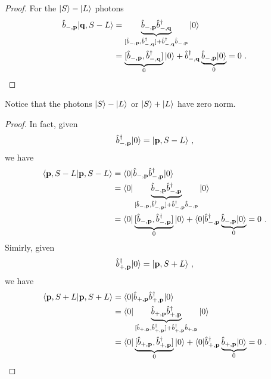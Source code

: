 \begin{proof}
        For the $\vert S\rangle - \vert L\rangle$ photons
        \begin{equation*}
        \begin{aligned}
            \hat b_{-, \mathbf p} \vert\mathbf q, S - L\rangle & = \underbrace{\hat b_{-, \mathbf p} \hat b_{-,\mathbf q}^{\dagger}}_{[\hat b_{-, \mathbf p}, \hat b_{-,\mathbf q}^{\dagger}] + \hat b_{-,\mathbf q}^{\dagger} \hat b_{-, \mathbf p} } \vert0\rangle \\ & = \underbrace{[\hat b_{-, \mathbf p}, \hat b_{-,\mathbf q}^{\dagger}]}_{0} \vert0\rangle + \hat b_{-,\mathbf q}^{\dagger} \underbrace{\hat b_{-, \mathbf p} \vert0\rangle}_0 = 0 ~.
        \end{aligned}
        \end{equation*}
    \end{proof}

    Notice that the photons $\vert S\rangle - \vert L\rangle$ or $\vert S\rangle + \vert L\rangle$ have zero norm. 
    \begin{proof}
        In fact, given
        \begin{equation*}
            \hat b_{-, \mathbf p}^\dagger \vert0\rangle = \vert\mathbf p, S - L\rangle ~,
        \end{equation*}
        we have 
        \begin{equation*}
        \begin{aligned}
            \langle\mathbf p, S-L\vert\mathbf p, S-L\rangle & = \langle0\vert \hat b_{-, \mathbf p} \hat b_{-, \mathbf p}^\dagger \vert0\rangle \\ & = \langle0\vert \underbrace{\hat b_{-, \mathbf p} \hat b_{-, \mathbf p}^\dagger}_{[\hat b_{-, \mathbf p} , \hat b_{-, \mathbf p}^\dagger] + \hat b_{-, \mathbf p}^\dagger \hat b_{-, \mathbf p}} \vert0\rangle \\ & = \langle0\vert \underbrace{[\hat b_{-, \mathbf p} , \hat b_{-, \mathbf p}^\dagger]}_0 \vert0\rangle + \langle0\vert \hat b_{-, \mathbf p}^\dagger \underbrace{\hat b_{-, \mathbf p} \vert0\rangle}_0 = 0 ~.
        \end{aligned}
        \end{equation*}
        Simirly, given
        \begin{equation*}
            \hat b_{+, \mathbf p}^\dagger \vert0\rangle = \vert\mathbf p, S + L\rangle ~,
        \end{equation*}
        we have 
        \begin{equation*}
        \begin{aligned}
            \langle\mathbf p, S+L\vert\mathbf p, S+L\rangle & = \langle0\vert \hat b_{+, \mathbf p} \hat b_{+, \mathbf p}^\dagger \vert0\rangle \\ & = \langle0\vert \underbrace{\hat b_{+, \mathbf p} \hat b_{+, \mathbf p}^\dagger}_{[\hat b_{+, \mathbf p} , \hat b_{+, \mathbf p}^\dagger] + \hat b_{+, \mathbf p}^\dagger \hat b_{+, \mathbf p}} \vert0\rangle \\ & = \langle0\vert \underbrace{[\hat b_{+, \mathbf p} , \hat b_{+, \mathbf p}^\dagger]}_0 \vert0\rangle + \langle0\vert \hat b_{+, \mathbf p}^\dagger \underbrace{\hat b_{+, \mathbf p} \vert0\rangle}_0 = 0 ~.
        \end{aligned}
        \end{equation*}
    \end{proof}

